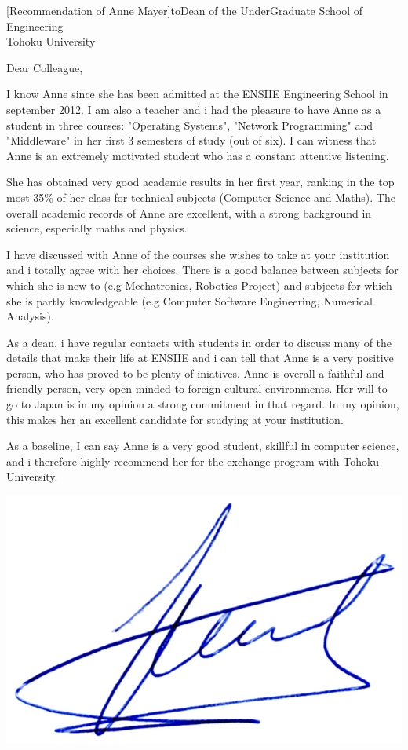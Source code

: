 \documentclass[a4paper,10pt]{article}
\begin{document}

\begin{letter}[Recommendation of Anne Mayer]{to}{Dean of the UnderGraduate School of Engineering\\%
Tohoku University}

Dear Colleague, 

I know Anne since she has been admitted at the ENSIIE Engineering School in september 2012.
I am also a teacher and i had the pleasure to have Anne as a student in three courses: 
"Operating Systems", "Network Programming" and "Middleware" in her first 3 semesters of 
study (out of six). I can witness that Anne is an extremely motivated student who has
a constant attentive listening.

She has obtained very good academic results in her first year, ranking in the top most 35\%
of her class for technical subjects (Computer Science and Maths).
The overall academic records of Anne are excellent, with a strong background in science,
especially maths and physics.

I have discussed with Anne of the courses she wishes to take at your institution
and i totally agree with her choices. There is a good balance between subjects for which
she is new to (e.g Mechatronics, Robotics Project) and subjects for which she is
partly knowledgeable (e.g Computer Software Engineering, Numerical Analysis).


As a dean, i have regular contacts with students in order to discuss many of the details
that make their life at ENSIIE and i can tell that Anne is a very positive person,
who has proved to be plenty of iniatives.
Anne is overall a faithful and friendly person, very open-minded to foreign cultural 
environments. Her will to go to Japan is in my opinion a strong commitment in that 
regard. In my opinion, this makes her an excellent candidate for studying at your 
institution.


As a baseline, I can say Anne is a very good student, skillful in computer science,
and i therefore highly recommend her for the exchange program with Tohoku University.

\end{letter}
\begin{flushright}
\includegraphics[width=.26\textwidth]{signgenaud.jpg}
\end{flushright}
%
%
\end{document}
